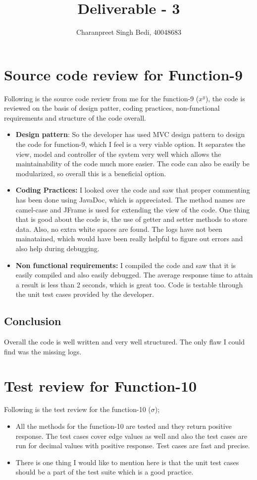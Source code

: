 \documentclass[12pt]{article}
\title{Deliverable - 3}
\author{Charanpreet Singh Bedi, 40048683}
\date{}
\begin{document}
\maketitle

\section*{Source code review for Function-9}
Following is the source code review from me for the function-9 ($x^y$), the code is reviewed on the basis of design patter, coding practices, non-functional requirements and structure of the code overall.
\begin{itemize}
    \item \textbf{Design pattern}: So the developer has used MVC design pattern to design the code for function-9, which I feel is a very viable option. It separates the view, model and controller of the system very well which allows the maintainability of the code much more easier. The code can also be easily be modularized, so overall this is a beneficial option. 
    \item \textbf{Coding Practices:} I looked over the code and saw that proper commenting has been done using JavaDoc, which is appreciated. The method names are camel-case and JFrame is used for extending the view of the code. One thing that is good about the code is, the use of getter and setter methods to store data. Also, no extra white spaces are found. The logs have not been mainatained, which would have been really helpful to figure out errors and also help during debugging.
    \item \textbf{Non functional requirements:} I compiled the code and saw that it is easily compiled and also easily debugged. The average response time to attain a result is less than 2 seconds, which is great too. Code is testable through the unit test cases provided by the developer. 
\end{itemize}
\subsection*{Conclusion}
Overall the code is well written and very well structured. The only flaw I could find was the missing logs.

\newpage

\section*{Test review for Function-10}
Following is the test review for the function-10 ($\sigma$);
\begin{itemize}
    \item All the methods for the function-10 are tested and they return positive response. The test cases cover edge values as well and also the test cases are run for decimal values with positive response. Test cases are fast and precise. 
    \item There is one thing I would like to mention here is that the unit test cases should be a part of the test suite which is a good practice.
\end{itemize}
\end{document}
